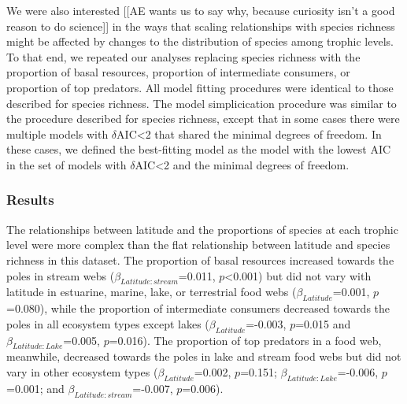 \documentclass[12pt]{article}
\begin{document}
    We were also interested [[AE wants us to say why, because curiosity isn't a good reason to do science]] 
    in the ways that scaling relationships with species richness might
    be affected by changes to the distribution of species among trophic levels. To
    that end, we repeated our analyses replacing species richness with the
    proportion of basal resources, proportion of intermediate consumers,
    or proportion of top predators. All model fitting procedures were identical to those
    described for species richness. The model simplicication procedure was similar to
    the procedure described for species richness, except that in some cases there were
    multiple models with $\delta$AIC\textless2 that shared the minimal degrees of freedom.
    In these cases, we defined the best-fitting model as the model with the lowest AIC in the
    set of models with $\delta$AIC\textless2 and the minimal degrees of freedom.


  \subsubsection*{Results}

    The relationships between latitude and the proportions of species at each
    trophic level were more complex than the flat relationship between latitude
    and species richness in this dataset.  The proportion of basal resources
    increased towards the poles in stream webs
    ($\beta_{Latitude:stream}$=0.011, $p$\textless0.001)  but did not vary
    with latitude in estuarine, marine, lake, or terrestrial  food webs
    ($\beta_{Latitude}$=0.001, $p$=0.080), while the proportion of
    intermediate consumers decreased towards the poles in all ecosystem types
    except lakes ($\beta_{Latitude}$=-0.003, $p$=0.015 and
    $\beta_{Latitude:Lake}$=0.005, $p$=0.016). The proportion of top predators
    in a food web,  meanwhile, decreased towards the poles in lake and  stream
    food webs but did not vary in other ecosystem types
    ($\beta_{Latitude}$=0.002, $p$=0.151;  $\beta_{Latitude:Lake}$=-0.006,
    $p$=0.001; and $\beta_{Latitude:stream}$=-0.007, $p$=0.006).
\end{document}
